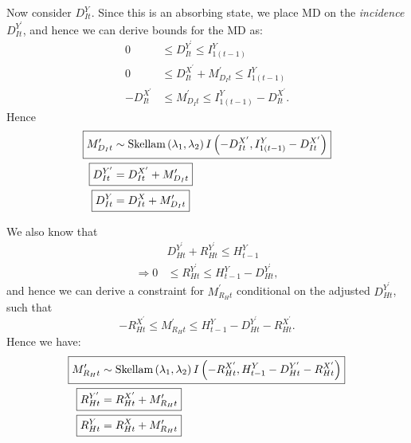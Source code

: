 \documentclass[a4paper]{article}
\begin{document}
Now consider $D^Y_{It}$. Since this is an absorbing state, we place MD on the \textit{incidence} $D^{Y^\prime}_{It}$, and hence we can derive bounds for the MD as:
\begin{align*}
    0 &\leq D^{Y^\prime}_{It} \leq I^Y_{1(t - 1)}\\
    0 &\leq D^{X^\prime}_{It} + M^\prime_{D_It} \leq I^Y_{1(t - 1)}\\ 
    -D^{X^\prime}_{It} &\leq M^\prime_{D_It} \leq I^Y_{1(t - 1)} - D^{X^\prime}_{It}.
\end{align*}
Hence
\begin{align*}
\Aboxed{M^\prime_{D_It} &\sim \mbox{Skellam}\left(\lambda_1, \lambda_2\right)I\left(-D^{X^\prime}_{It}, I^Y_{1(t - 1)} - D^{X^\prime}_{It}\right)}\\
    \Aboxed{D^{Y^\prime}_{It} &= D^{X^\prime}_{It} + M^\prime_{D_It}}\\
    \Aboxed{D^Y_{It} &= D^X_{It} + M^\prime_{D_It}}
\end{align*}

We also know that
\begin{align*}
    &D^{Y^\prime}_{Ht} + R^{Y^\prime}_{Ht} \leq H^Y_{t - 1}\\
    \Rightarrow 0 &\leq R^{Y^\prime}_{Ht} \leq H^Y_{t - 1} - D^{Y^\prime}_{Ht},
\end{align*}
and hence we can derive a constraint for $M^\prime_{R_Ht}$ conditional on the adjusted $D^{Y^\prime}_{Ht}$, such that
\begin{equation*}
    -R^{X^\prime}_{Ht} \leq M^\prime_{R_Ht} \leq H^Y_{t - 1} - D^{Y^\prime}_{Ht} - R^{X^\prime}_{Ht}.
\end{equation*}
Hence we have:
\begin{align*}
\Aboxed{M^\prime_{R_Ht} &\sim \mbox{Skellam}\left(\lambda_1, \lambda_2\right)I\left(-R^{X^\prime}_{Ht}, H^Y_{t - 1} - D^{Y^\prime}_{Ht} - R^{X^\prime}_{Ht}\right)}\\
    \Aboxed{R^{Y^\prime}_{Ht} &= R^{X^\prime}_{Ht} + M^\prime_{R_Ht}}\\
    \Aboxed{R^Y_{Ht} &= R^X_{Ht} + M^\prime_{R_Ht}}
\end{align*}
\end{document}
